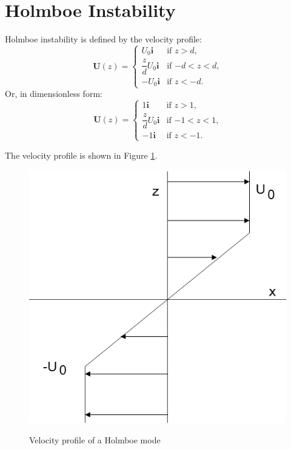 \section{Holmboe Instability} Holmboe instability is defined by the
velocity profile:
\begin{equation}\label{ho:pro}
\mathbf{U}(z) =
\begin{cases}
U_0 \mathbf{i} &\text{if $z>d$,}\\
\dfrac{z}{d}U_0\mathbf{i} &\text{if $-d<z<d$,}\\
-U_0 \mathbf{i} &\text{if $z<-d$.}
\end{cases}
\end{equation}
Or, in dimensionless form:
\begin{equation}\label{ho:pro2}
\mathbf{U}(z) =
\begin{cases}
1 \mathbf{i} &\text{if $z>1$,}\\
\dfrac{z}{d}U_0\mathbf{i} &\text{if $-1<z<1$,}\\
-1 \mathbf{i} &\text{if $z<-1$.}
\end{cases}
\end{equation}

The velocity profile is shown in Figure \ref{hopro}.
\begin{figure}[htpb]
  \centering
  \includegraphics[width=0.9\textheight]{hopro.png}\\
  \caption{Velocity profile of a Holmboe mode}\label{hopro}
\end{figure}
